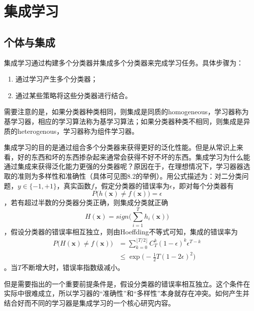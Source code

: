 \chapter{集成学习}

\section{个体与集成}

集成学习通过构建多个分类器并集成多个分类器来完成学习任务。具体步骤为：
\begin{enumerate}
\item 通过学习产生多个分类器；
\item 通过某些策略将这些分类器进行结合。
\end{enumerate}
需要注意的是，如果分类器种类相同，则集成是同质的homogeneous，学习器称为基学习器，相应的学习算法称为基学习算法；如果分类器种类不相同，则集成是异质的heterogenous，学习器称为组件学习器。

集成学习的目的是通过组合多个分类器来获得更好的泛化性能。但是从常识上来看，好的东西和坏的东西掺杂起来通常会获得不好不坏的东西。集成学习为什么能通过集成来获得泛化能力更强的分类器呢？原因在于，在理想情况下，学习器器选取的准则为多样性和准确性（具体可见图8.2的举例）。用公式描述为：对二分类问题，$y\in \{-1,+1\}$，真实函数$f$，假定分类器的错误率为$\epsilon$，即对每个分类器有
\begin{equation}
P\big(h(\mathbf{x})\neq f(\mathbf{x})\big)=\epsilon
\end{equation}，若有超过半数的分类器分类正确，则集成分类就正确
\begin{equation}
H(\mathbf{x})=sign\Big(\sum_{i=1}^Th_i(\mathbf{x})\Big)
\end{equation}
，假设分类器的错误率相互独立，则由Hoeffding不等式可知，集成的错误率为
\begin{equation}\begin{split}
P\Big(H(\mathbf{x})\neq f(\mathbf{x})\Big)&=\sum_{k=0}^{\lfloor T/2 \rfloor}C_T^k(1-\epsilon)^k\epsilon^{T-k}\\
&\le \exp\Big(-\frac{1}{2}T(1-2\epsilon)^2\Big)
\end{split}\end{equation}
。当$T$不断增大时，错误率指数级减小。

但是需要指出的一个重要前提条件是，假设分类器的错误率相互独立。这个条件在实际中很难成立，所以学习器的``准确性''和``多样性''本身就存在冲突。如何产生并结合好而不同的学习器是集成学习的一个核心研究内容。

